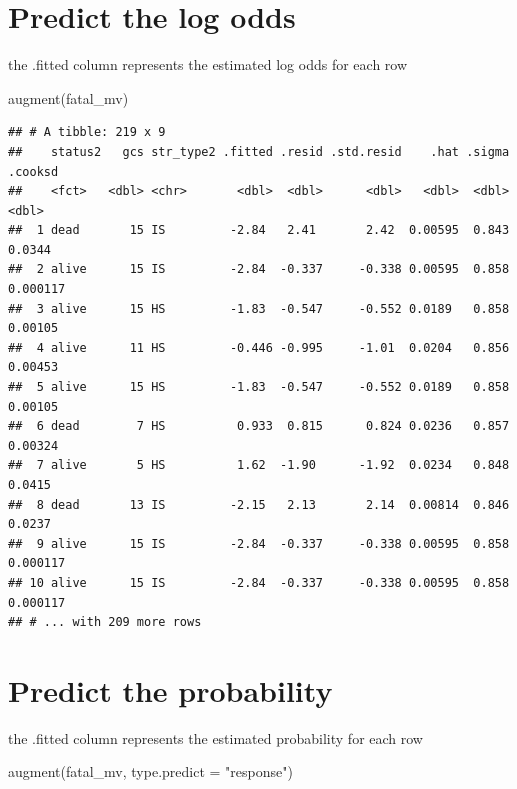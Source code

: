 \documentclass[
]{book}
\makeatletter
\newenvironment{Shaded}{\begin{snugshade}}{\end{snugshade}}
\newcommand{\AttributeTok}[1]{\textcolor[rgb]{0.61,0.61,0.61}{#1}}
\newcommand{\FunctionTok}[1]{\textcolor[rgb]{0,0,0}{#1}}
\newcommand{\NormalTok}[1]{#1}
\newcommand{\StringTok}[1]{\textcolor[rgb]{0.5,0.5,0.5}{#1}}
\newenvironment{kframe}{%
\medskip{}
\setlength{\fboxsep}{.8em}
 \def\at@end@of@kframe{}%
 \ifinner\ifhmode%
  \def\at@end@of@kframe{\end{minipage}}%
  \begin{minipage}{\columnwidth}%
 \fi\fi%
 \def\FrameCommand##1{\hskip\@totalleftmargin \hskip-\fboxsep
 \colorbox{shadecolor}{##1}\hskip-\fboxsep
     \hskip-\linewidth \hskip-\@totalleftmargin \hskip\columnwidth}%
 \MakeFramed {\advance\hsize-\width
   \@totalleftmargin\z@ \linewidth\hsize
   \@setminipage}}%
 {\par\unskip\endMakeFramed%
 \at@end@of@kframe}
\renewenvironment{Shaded}{\begin{kframe}}{\end{kframe}}
\makeatother
\begin{document}
\hypertarget{predict-the-log-odds}{%
\section{Predict the log odds}\label{predict-the-log-odds}}

the .fitted column represents the estimated log odds for each row

\begin{Shaded}
\begin{Highlighting}[]
\FunctionTok{augment}\NormalTok{(fatal\_mv)}
\end{Highlighting}
\end{Shaded}

\begin{verbatim}
## # A tibble: 219 x 9
##    status2   gcs str_type2 .fitted .resid .std.resid    .hat .sigma  .cooksd
##    <fct>   <dbl> <chr>       <dbl>  <dbl>      <dbl>   <dbl>  <dbl>    <dbl>
##  1 dead       15 IS         -2.84   2.41       2.42  0.00595  0.843 0.0344  
##  2 alive      15 IS         -2.84  -0.337     -0.338 0.00595  0.858 0.000117
##  3 alive      15 HS         -1.83  -0.547     -0.552 0.0189   0.858 0.00105 
##  4 alive      11 HS         -0.446 -0.995     -1.01  0.0204   0.856 0.00453 
##  5 alive      15 HS         -1.83  -0.547     -0.552 0.0189   0.858 0.00105 
##  6 dead        7 HS          0.933  0.815      0.824 0.0236   0.857 0.00324 
##  7 alive       5 HS          1.62  -1.90      -1.92  0.0234   0.848 0.0415  
##  8 dead       13 IS         -2.15   2.13       2.14  0.00814  0.846 0.0237  
##  9 alive      15 IS         -2.84  -0.337     -0.338 0.00595  0.858 0.000117
## 10 alive      15 IS         -2.84  -0.337     -0.338 0.00595  0.858 0.000117
## # ... with 209 more rows
\end{verbatim}

\hypertarget{predict-the-probability}{%
\section{Predict the probability}\label{predict-the-probability}}

the .fitted column represents the estimated probability for each row

\begin{Shaded}
\begin{Highlighting}[]
\FunctionTok{augment}\NormalTok{(fatal\_mv, }\AttributeTok{type.predict =} \StringTok{"response"}\NormalTok{)}
\end{Highlighting}
\end{Shaded}
\end{document}
